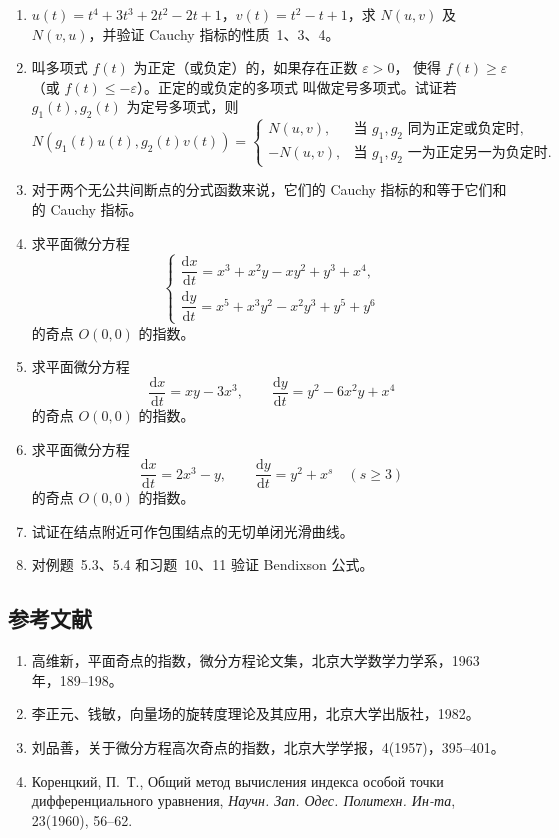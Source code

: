 \begin{enumerate}
\[\]
时，非线性方程的奇点指数等于相应的线性方程的奇点指数。
\item $u(t)=t^4+3t^3+2t^2-2t+1$，$v(t)=t^2-t+1$，求 $N(u,v)$ 及
$N(v,u)$，并验证 Cauchy 指标的性质~1、3、4。
\item 叫多项式 $f(t)$ 为正定（或负定）的，如果存在正数 $\varepsilon>0$，
使得 $f(t)\geq\varepsilon$（或 $f(t)\leq-\varepsilon$）。正定的或负定的多项式
叫做定号多项式。试证若 $g_1(t),g_2(t)$ 为定号多项式，则
\[
N(g_1(t)u(t),g_2(t)v(t))
=\begin{cases}
N(u,v),&\text{当 }g_1,g_2\text{ 同为正定或负定时},\\
-N(u,v),&\text{当 }g_1,g_2\text{ 一为正定另一为负定时}.
\end{cases}
\]
\item 对于两个无公共间断点的分式函数来说，它们的 Cauchy 指标的和等于它们和的
Cauchy 指标。
\item 求平面微分方程
\[
\begin{cases}
\dfrac{\mathrm{d}x}{\mathrm{d}t}=x^3+x^2y-xy^2+y^3+x^4,\\
\dfrac{\mathrm{d}y}{\mathrm{d}t}=x^5+x^3y^2-x^2y^3+y^5+y^6
\end{cases}
\]
的奇点 $O(0,0)$ 的指数。
\item 求平面微分方程
\[
\dfrac{\mathrm{d}x}{\mathrm{d}t}=xy-3x^3,\qquad
\dfrac{\mathrm{d}y}{\mathrm{d}t}=y^2-6x^2y+x^4
\]
的奇点 $O(0,0)$ 的指数。
\item 求平面微分方程
\[
\dfrac{\mathrm{d}x}{\mathrm{d}t}=2x^3-y,\qquad
\dfrac{\mathrm{d}y}{\mathrm{d}t}=y^2+x^s\quad(s\geq3)
\]
的奇点 $O(0,0)$ 的指数。
\item 试证在结点附近可作包围结点的无切单闭光滑曲线。
\item 对例题~5.3、5.4 和习题~10、11 验证 Bendixson 公式。
\end{enumerate}

\subsection*{参考文献}

\begin{enumerate}
\item 高维新，平面奇点的指数，微分方程论文集，北京大学数学力学系，1963 年，189--198。
\item 李正元、钱敏，向量场的旋转度理论及其应用，北京大学出版社，1982。
\item 刘品善，关于微分方程高次奇点的指数，北京大学学报，4(1957)，395--401。
\item Коренцкий, П.\ Т., Общий метод вычисления индекса особой точки
дифференциального уравнения, \textit{Научн. Зап. Одес. Политехн. Ин-та},
23(1960), 56--62.
\end{enumerate}

\endinput
